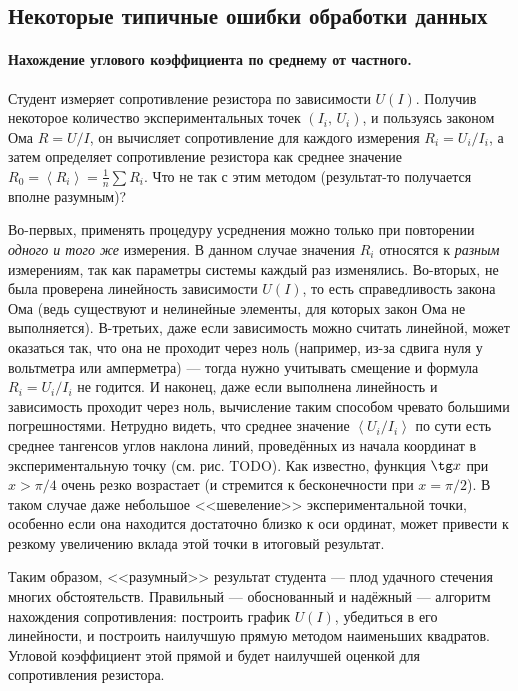 \documentclass[10pt]{article}
\begin{document}
\subsection{Некоторые типичные ошибки обработки данных}

\paragraph{Нахождение углового коэффициента по среднему от частного.}

Студент измеряет сопротивление резистора по зависимости $U\!\left(I\right)$.
Получив некоторое количество экспериментальных точек $\left(I_{i},\,U_{i}\right)$,
и пользуясь законом Ома $R=U/I$, он вычисляет сопротивление для каждого
измерения $R_{i}=U_{i}/I_{i}$, а затем определяет сопротивление резистора
как среднее значение $R_{0}=\left\langle R_{i}\right\rangle =\frac{1}{n}\sum R_{i}$.
Что не так с этим методом (результат-то получается вполне разумным)?

{\footnotesize
Во-первых, применять процедуру усреднения можно только
при повторении \emph{одного и того же} измерения. В данном случае значения $R_{i}$
относятся к \emph{разным} измерениям, так как параметры системы каждый раз изменялись.
Во-вторых, не была проверена линейность зависимости $U\left(I\right)$, то есть
справедливость закона Ома (ведь существуют и нелинейные элементы,
для которых закон Ома не выполняется). В-третьих, даже если зависимость
можно считать линейной, может оказаться так, что она не проходит через
ноль (например, из-за сдвига нуля у вольтметра или амперметра) ---
тогда нужно учитывать смещение и формула $R_{i}=U_{i}/I_{i}$ не годится.
И наконец, даже если выполнена линейность и зависимость проходит через
ноль, вычисление таким способом чревато большими погрешностями. Нетрудно
видеть, что среднее значение $\left\langle U_{i}/I_{i}\right\rangle $
по сути есть среднее тангенсов углов наклона линий, проведённых из
начала координат в экспериментальную точку (см. рис. TODO). Как известно,
функция $\tg x$ при $x>\pi/4$ очень резко возрастает (и стремится
к бесконечности при $x=\pi/2$). В таком случае даже небольшое <<шевеление>>
экспериментальной точки, особенно если она находится достаточно близко
к оси ординат, может привести к резкому увеличению вклада этой точки
в итоговый результат.

Таким образом, <<разумный>> результат студента --- плод удачного стечения многих
обстоятельств. Правильный --- обоснованный и надёжный --- алгоритм
нахождения сопротивления: построить график $U\left(I\right)$, убедиться
в его линейности, и построить наилучшую прямую методом наименьших
квадратов. Угловой коэффициент этой прямой и будет наилучшей оценкой
для сопротивления резистора.\par
}%
\end{document}
